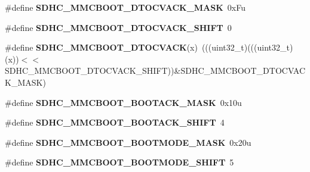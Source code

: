 \begin{DoxyCompactItemize}
\item 
\#define {\bfseries S\+D\+H\+C\+\_\+\+M\+M\+C\+B\+O\+O\+T\+\_\+\+D\+T\+O\+C\+V\+A\+C\+K\+\_\+\+M\+A\+SK}~0x\+Fu\hypertarget{group__SDHC__Register__Masks_ga243f17fb68ebb17a8a62a31a34530a1f}{}\label{group__SDHC__Register__Masks_ga243f17fb68ebb17a8a62a31a34530a1f}

\item 
\#define {\bfseries S\+D\+H\+C\+\_\+\+M\+M\+C\+B\+O\+O\+T\+\_\+\+D\+T\+O\+C\+V\+A\+C\+K\+\_\+\+S\+H\+I\+FT}~0\hypertarget{group__SDHC__Register__Masks_ga63ba85bfa2ccf68011e8afcf6f2c03b4}{}\label{group__SDHC__Register__Masks_ga63ba85bfa2ccf68011e8afcf6f2c03b4}

\item 
\#define {\bfseries S\+D\+H\+C\+\_\+\+M\+M\+C\+B\+O\+O\+T\+\_\+\+D\+T\+O\+C\+V\+A\+CK}(x)~(((uint32\+\_\+t)(((uint32\+\_\+t)(x))$<$$<$S\+D\+H\+C\+\_\+\+M\+M\+C\+B\+O\+O\+T\+\_\+\+D\+T\+O\+C\+V\+A\+C\+K\+\_\+\+S\+H\+I\+FT))\&S\+D\+H\+C\+\_\+\+M\+M\+C\+B\+O\+O\+T\+\_\+\+D\+T\+O\+C\+V\+A\+C\+K\+\_\+\+M\+A\+SK)\hypertarget{group__SDHC__Register__Masks_ga51ddb837c8ee3f7997ab5e64bd5b6bfa}{}\label{group__SDHC__Register__Masks_ga51ddb837c8ee3f7997ab5e64bd5b6bfa}

\item 
\#define {\bfseries S\+D\+H\+C\+\_\+\+M\+M\+C\+B\+O\+O\+T\+\_\+\+B\+O\+O\+T\+A\+C\+K\+\_\+\+M\+A\+SK}~0x10u\hypertarget{group__SDHC__Register__Masks_ga878fce0feabab8806e311871a08386c9}{}\label{group__SDHC__Register__Masks_ga878fce0feabab8806e311871a08386c9}

\item 
\#define {\bfseries S\+D\+H\+C\+\_\+\+M\+M\+C\+B\+O\+O\+T\+\_\+\+B\+O\+O\+T\+A\+C\+K\+\_\+\+S\+H\+I\+FT}~4\hypertarget{group__SDHC__Register__Masks_gadd901321f62235462c051a551b132354}{}\label{group__SDHC__Register__Masks_gadd901321f62235462c051a551b132354}

\item 
\#define {\bfseries S\+D\+H\+C\+\_\+\+M\+M\+C\+B\+O\+O\+T\+\_\+\+B\+O\+O\+T\+M\+O\+D\+E\+\_\+\+M\+A\+SK}~0x20u\hypertarget{group__SDHC__Register__Masks_ga0cdf366302c98d1227b0092048c0ac5a}{}\label{group__SDHC__Register__Masks_ga0cdf366302c98d1227b0092048c0ac5a}

\item 
\#define {\bfseries S\+D\+H\+C\+\_\+\+M\+M\+C\+B\+O\+O\+T\+\_\+\+B\+O\+O\+T\+M\+O\+D\+E\+\_\+\+S\+H\+I\+FT}~5\hypertarget{group__SDHC__Register__Masks_ga2f4f7807f581a3e18d0f1e9f151f74b3}{}\label{group__SDHC__Register__Masks_ga2f4f7807f581a3e18d0f1e9f151f74b3}


\end{DoxyCompactItemize}
